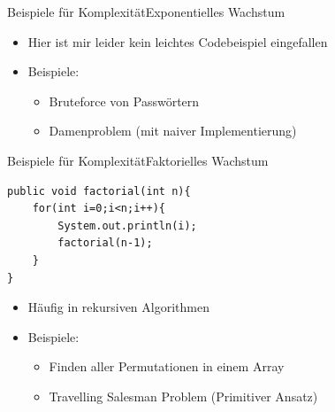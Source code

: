 \begin{frame}{Beispiele für Komplexität}{Exponentielles Wachstum}
\begin{itemize}
    \item Hier ist mir leider kein leichtes Codebeispiel eingefallen
    \item Beispiele:
    \begin{itemize}
        \item Bruteforce von Passwörtern 
        \item Damenproblem (mit naiver Implementierung)
    \end{itemize}
\end{itemize}
\end{frame}

\begin{frame}[fragile]{Beispiele für Komplexität}{Faktorielles Wachstum}
\lstset{style=java}
\begin{lstlisting}
public void factorial(int n){
    for(int i=0;i<n;i++){
        System.out.println(i);
        factorial(n-1);
    }
}
\end{lstlisting}
\begin{itemize}
    \item Häufig in rekursiven Algorithmen
    \item Beispiele:
    \begin{itemize}
        \item Finden aller Permutationen in einem Array
        \item Travelling Salesman Problem (Primitiver Ansatz)
    \end{itemize}
\end{itemize}
\end{frame}